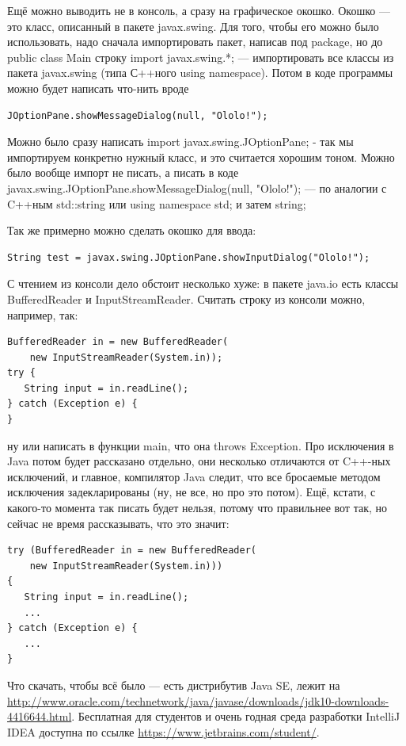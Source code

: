 \documentclass[a5paper]{article}
\begin{document}
Ещё можно выводить не в консоль, а сразу на графическое окошко. Окошко --- это класс, описанный в пакете javax.swing. Для того, чтобы его можно было использовать, надо сначала импортировать пакет, написав под package, но до public class Main строку import javax.swing.*; --- импортировать все классы из пакета javax.swing (типа С++ного using namespace). Потом в коде программы можно будет написать что-нить вроде

\begin{verbatim}
JOptionPane.showMessageDialog(null, "Ololo!");
\end{verbatim}

Можно было сразу написать import javax.swing.JOptionPane; - так мы импортируем конкретно нужный класс, и это считается хорошим тоном. Можно было вообще импорт не писать, а писать в коде javax.swing.JOptionPane.showMessageDialog(null, "Ololo!");  --- по аналогии с C++ным std::string или using namespace std; и затем string;

Так же примерно можно сделать окошко для ввода:

\begin{verbatim}
String test = javax.swing.JOptionPane.showInputDialog("Ololo!");
\end{verbatim}

С чтением из консоли дело обстоит несколько хуже: в пакете java.io есть классы BufferedReader и InputStreamReader. Считать строку из консоли можно, например, так:

\begin{verbatim}
BufferedReader in = new BufferedReader(
    new InputStreamReader(System.in));
try {
   String input = in.readLine();
} catch (Exception e) {
}
\end{verbatim}

ну или написать в функции main, что она throws Exception. Про исключения в Java потом будет рассказано отдельно, они несколько отличаются от C++-ных исключений, и главное, компилятор Java следит, что все бросаемые методом исключения задекларированы (ну, не все, но про это потом). Ещё, кстати, с какого-то момента так писать будет нельзя, потому что правильнее вот так, но сейчас не время рассказывать, что это значит:

\begin{verbatim}
try (BufferedReader in = new BufferedReader(
    new InputStreamReader(System.in))) 
{
   String input = in.readLine();
   ...
} catch (Exception e) {
   ...
}
\end{verbatim}

Что скачать, чтобы всё было --- есть дистрибутив Java SE, лежит на \url{http://www.oracle.com/technetwork/java/javase/downloads/jdk10-downloads-4416644.html}. Бесплатная для студентов и очень годная среда разработки IntelliJ IDEA доступна по ссылке \url{https://www.jetbrains.com/student/}. 
\end{document}
